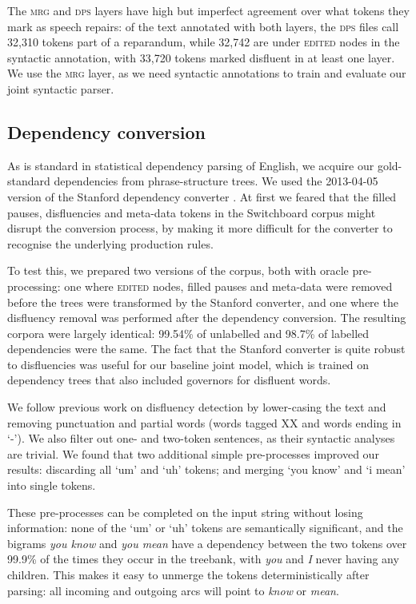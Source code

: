 \documentclass[11pt,letterpaper]{article}
\begin{document}
The \textsc{mrg} and \textsc{dps} layers have high but imperfect agreement over
what tokens they mark as speech repairs: of the text annotated with both layers,
the \textsc{dps} files call 32,310 tokens part of a reparandum, while 32,742 are
under \textsc{edited} nodes in the syntactic annotation, with 33,720 tokens marked
disfluent in at least one layer. We use the \textsc{mrg} layer, as we need syntactic
annotations to train and evaluate our joint syntactic parser.

\subsection{Dependency conversion}

\label{sec:deps}
As is standard in statistical dependency parsing of English, we acquire our
gold-standard dependencies from phrase-structure trees.
We used the 2013-04-05 version of the Stanford dependency converter \citep{stanford_deps}.
At first we feared that the filled pauses, disfluencies and meta-data tokens in
the Switchboard corpus might disrupt the conversion process, by making it more
difficult for the converter to recognise the underlying production rules.

To test this, we prepared two versions of the corpus, both with oracle pre-processing:
one where \textsc{edited} nodes, filled pauses and meta-data were removed before
the trees were transformed by the Stanford converter, and one where the disfluency
removal was performed after the dependency conversion. The resulting corpora
were largely identical: 99.54\% of unlabelled and 98.7\% of labelled dependencies
were the same. The fact that the Stanford converter is quite robust to disfluencies
was useful for our baseline joint model, which is
trained on dependency trees that also included governors for disfluent words.

We follow previous work on disfluency detection by lower-casing the text and
removing punctuation and partial words (words tagged XX and words ending in
`-').  We also filter out one- and two-token sentences, as their syntactic
analyses are trivial.
We found that two additional simple pre-processes improved our results: discarding
all `um' and `uh' tokens; and merging `you know' and `i mean' into single tokens.

These pre-processes can be completed on the input string without losing information:
none of the `um' or `uh' tokens are semantically significant, and
the bigrams \emph{you know} and \emph{you mean} have a dependency between the two
tokens over 99.9\% of the times they occur in the treebank, with \emph{you} and \emph{I}
never having any children. This makes it easy to unmerge the tokens deterministically
after parsing:
all incoming and outgoing arcs will point to \emph{know} or \emph{mean}.
\end{document}
